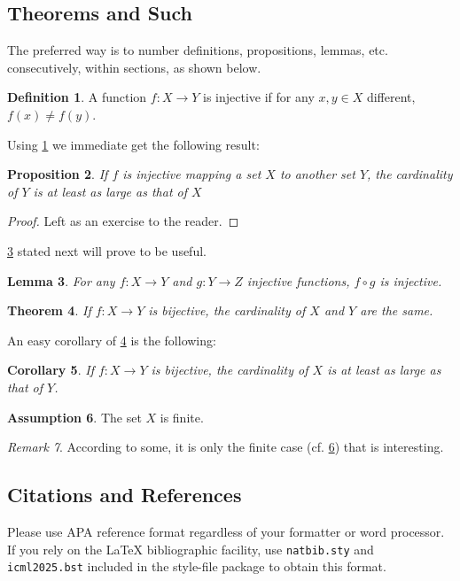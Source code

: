 \documentclass{article}
\theoremstyle{plain}
\newtheorem{theorem}{Theorem}[section]
\newtheorem{proposition}[theorem]{Proposition}
\newtheorem{lemma}[theorem]{Lemma}
\newtheorem{corollary}[theorem]{Corollary}
\theoremstyle{definition}
\newtheorem{definition}[theorem]{Definition}
\newtheorem{assumption}[theorem]{Assumption}
\theoremstyle{remark}
\newtheorem{remark}[theorem]{Remark}
\begin{document}
\subsection{Theorems and Such}
The preferred way is to number definitions, propositions, lemmas, etc.
consecutively, within sections, as shown below.
\begin{definition}
  \label{def:inj}
  A function $f:X \to Y$ is injective if for any $x,y\in X$ different, $f(x)\ne
    f(y)$.
\end{definition}
Using \cref{def:inj} we immediate get the following result:
\begin{proposition}
  If $f$ is injective mapping a set $X$ to another set $Y$,
  the cardinality of $Y$ is at least as large as that of $X$
\end{proposition}
\begin{proof}
  Left as an exercise to the reader.
\end{proof}
\cref{lem:usefullemma} stated next will prove to be useful.
\begin{lemma}
  \label{lem:usefullemma}
  For any $f:X \to Y$ and $g:Y\to Z$ injective functions, $f \circ g$ is
  injective.
\end{lemma}
\begin{theorem}
  \label{thm:bigtheorem}
  If $f:X\to Y$ is bijective, the cardinality of $X$ and $Y$ are the same.
\end{theorem}
An easy corollary of \cref{thm:bigtheorem} is the following:
\begin{corollary}
  If $f:X\to Y$ is bijective,
  the cardinality of $X$ is at least as large as that of $Y$.
\end{corollary}
\begin{assumption}
  The set $X$ is finite.
  \label{ass:xfinite}
\end{assumption}
\begin{remark}
  According to some, it is only the finite case (cf. \cref{ass:xfinite}) that
  is interesting.
\end{remark}

\subsection{Citations and References}

Please use APA reference format regardless of your formatter or word processor.
If you rely on the \LaTeX\/ bibliographic facility, use \texttt{natbib.sty} and
\texttt{icml2025.bst} included in the style-file package to obtain this format.
\end{document}
